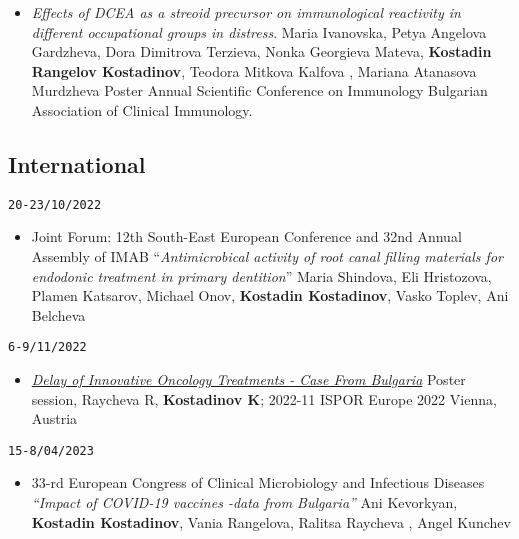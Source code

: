 \documentclass[
  12pt,
  letterpaper,
  DIV=11,
  numbers=noendperiod]{scrartcl}
\providecommand{\tightlist}{%
  \setlength{\itemsep}{0pt}\setlength{\parskip}{0pt}}\usepackage{longtable,booktabs,array}
\begin{document}
\begin{itemize}
\tightlist
\item
  \emph{Effects of DCEA as a streoid precursor on immunological
  reactivity in different occupational groups in distress}. \textbar{}
  Maria Ivanovska, Petya Angelova Gardzheva, Dora Dimitrova Terzieva,
  Nonka Georgieva Mateva, \textbf{Kostadin Rangelov Kostadinov}, Teodora
  Mitkova Kalfova , Mariana Atanasova Murdzheva \textbar{} Poster
  \textbar{} Annual Scientific Conference on Immunology \textbar{}
  Bulgarian Association of Clinical Immunology.
\end{itemize}

\subsection{International}\label{international-1}

\texttt{20-23/10/2022}

\begin{itemize}
\tightlist
\item
  Joint Forum: 12th South-East European Conference and 32nd Annual
  Assembly of IMAB \textbar{} ``\emph{Antimicrobical activity of root
  canal filling materials for endodonic treatment in primary
  dentition}'' \textbar{} Maria Shindova, Eli Hristozova, Plamen
  Katsarov, Michael Onov, \textbf{Kostadin Kostadinov}, Vasko Toplev,
  Ani Belcheva
\end{itemize}

\texttt{6-9/11/2022}

\begin{itemize}
\tightlist
\item
  \emph{\href{https://www.ispor.org/heor-resources/presentations-database/presentation/euro2022-3565/120960}{Delay
  of Innovative Oncology Treatments - Case From Bulgaria}} \textbar{}
  Poster session, Raycheva R, \textbf{Kostadinov K}; \textbar{} 2022-11
  \textbar{} ISPOR Europe 2022 \textbar{} Vienna, Austria
\end{itemize}

\texttt{15-8/04/2023}

\begin{itemize}
\tightlist
\item
  33-rd European Congress of Clinical Microbiology and Infectious
  Diseases \textbar{} \emph{``Impact of COVID-19 vaccines -data from
  Bulgaria''} \textbar{} Ani Kevorkyan, \textbf{Kostadin Kostadinov},
  Vania Rangelova, Ralitsa Raycheva , Angel Kunchev
\end{itemize}
\end{document}
